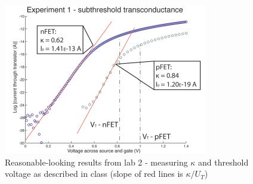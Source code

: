 \begin{figure}[ht]
\includegraphics[natwidth=675,natheight=500]{pics/nme_lab2exp1.pdf}
\caption{Reasonable-looking results from lab 2 - measuring $\kappa$ and threshold voltage as described in class (slope of red lines is $\kappa/U_T$) \label{lab2exp1}}
\end{figure}
